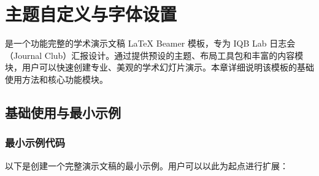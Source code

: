 
\chapter{主题自定义与字体设置}
\label{chap:3}

\Name 是一个功能完整的学术演示文稿 LaTeX Beamer 模板，专为 IQB Lab 日志会（Journal Club）汇报设计。通过提供预设的主题、布局工具包和丰富的内容模块，用户可以快速创建专业、美观的学术幻灯片演示。本章详细说明该模板的基础使用方法和核心功能模块。

\section{基础使用与最小示例}

\subsection{最小示例代码}

以下是创建一个完整演示文稿的最小示例。用户可以以此为起点进行扩展：

